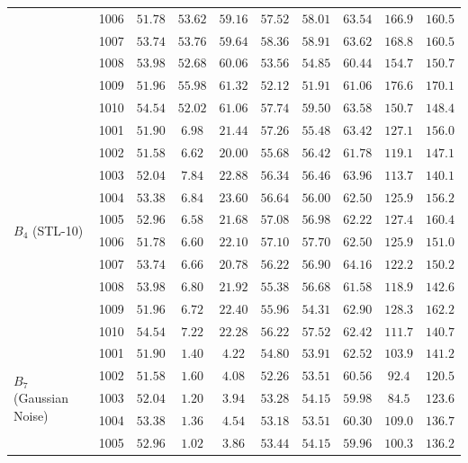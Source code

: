 \documentclass[sn-mathphys,Numbered]{sn-jnl}
\begin{document}
\begin{appendices}
\begin{table}[t]
{\begin{tabular}{l c c c c c c c c c}
 & 1006 & $51.78$ & $53.62$ & $59.16$ & $57.52$ & $58.01$ & $63.54$ & $166.9$ & $160.5$ \\
 & 1007 & $53.74$ & $53.76$ & $59.64$ & $58.36$ & $58.91$ & $63.62$ & $168.8$ & $160.5$ \\
 & 1008 & $53.98$ & $52.68$ & $60.06$ & $53.56$ & $54.85$ & $60.44$ & $154.7$ & $150.7$ \\
 & 1009 & $51.96$ & $55.98$ & $61.32$ & $52.12$ & $51.91$ & $61.06$ & $176.6$ & $170.1$ \\
 & 1010 & $54.54$ & $52.02$ & $61.06$ & $57.74$ & $59.50$ & $63.58$ & $150.7$ & $148.4$ \\
\midrule
\multirow{10}{*}{$B_4$ (STL-10)}
 & 1001 & $51.90$ & $6.98$ & $21.44$ & $57.26$ & $55.48$ & $63.42$ & $127.1$ & $156.0$ \\
 & 1002 & $51.58$ & $6.62$ & $20.00$ & $55.68$ & $56.42$ & $61.78$ & $119.1$ & $147.1$ \\
 & 1003 & $52.04$ & $7.84$ & $22.88$ & $56.34$ & $56.46$ & $63.96$ & $113.7$ & $140.1$ \\
 & 1004 & $53.38$ & $6.84$ & $23.60$ & $56.64$ & $56.00$ & $62.50$ & $125.9$ & $156.2$ \\
 & 1005 & $52.96$ & $6.58$ & $21.68$ & $57.08$ & $56.98$ & $62.22$ & $127.4$ & $160.4$ \\
 & 1006 & $51.78$ & $6.60$ & $22.10$ & $57.10$ & $57.70$ & $62.50$ & $125.9$ & $151.0$ \\
 & 1007 & $53.74$ & $6.66$ & $20.78$ & $56.22$ & $56.90$ & $64.16$ & $122.2$ & $150.2$ \\
 & 1008 & $53.98$ & $6.80$ & $21.92$ & $55.38$ & $56.68$ & $61.58$ & $118.9$ & $142.6$ \\
 & 1009 & $51.96$ & $6.72$ & $22.40$ & $55.96$ & $54.31$ & $62.90$ & $128.3$ & $162.2$ \\
 & 1010 & $54.54$ & $7.22$ & $22.28$ & $56.22$ & $57.52$ & $62.42$ & $111.7$ & $140.7$ \\
\midrule
\multirow{10}{*}{$B_7$ (Gaussian Noise)}
 & 1001 & $51.90$ & $1.40$ & $4.22$ & $54.80$ & $53.91$ & $62.52$ & $103.9$ & $141.2$ \\
 & 1002 & $51.58$ & $1.60$ & $4.08$ & $52.26$ & $53.51$ & $60.56$ & $92.4$ & $120.5$ \\
 & 1003 & $52.04$ & $1.20$ & $3.94$ & $53.28$ & $54.15$ & $59.98$ & $84.5$ & $123.6$ \\
 & 1004 & $53.38$ & $1.36$ & $4.54$ & $53.18$ & $53.51$ & $60.30$ & $109.0$ & $136.7$ \\
 & 1005 & $52.96$ & $1.02$ & $3.86$ & $53.44$ & $54.15$ & $59.96$ & $100.3$ & $136.2$ \\

\end{tabular}}
\end{table}
\end{appendices}
\end{document}
